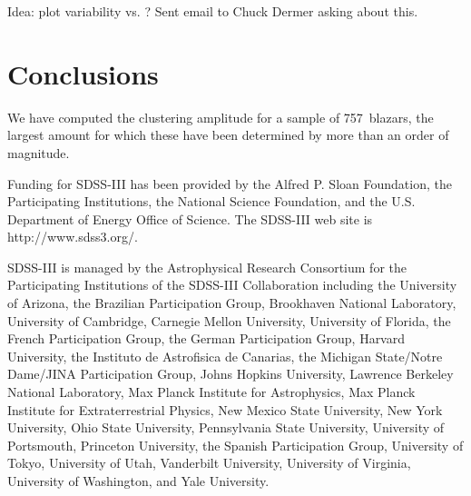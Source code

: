 \documentclass{emulateapj}
\begin{document}
Idea: plot variability vs. \bgb? Sent email to Chuck Dermer asking about this. 


\section{Conclusions}\label{sec_conclusions}

We have computed the clustering amplitude for a sample of 757~blazars, the largest amount for which these have been determined by more than an order of magnitude. 


\acknowledgments
Funding for SDSS-III has been provided by the Alfred P. Sloan Foundation, the Participating Institutions, the National Science Foundation, and the U.S. Department of Energy Office of Science. The SDSS-III web site is http://www.sdss3.org/.

SDSS-III is managed by the Astrophysical Research Consortium for the Participating Institutions of the SDSS-III Collaboration including the University of Arizona, the Brazilian Participation Group, Brookhaven National Laboratory, University of Cambridge, Carnegie Mellon University, University of Florida, the French Participation Group, the German Participation Group, Harvard University, the Instituto de Astrofisica de Canarias, the Michigan State/Notre Dame/JINA Participation Group, Johns Hopkins University, Lawrence Berkeley National Laboratory, Max Planck Institute for Astrophysics, Max Planck Institute for Extraterrestrial Physics, New Mexico State University, New York University, Ohio State University, Pennsylvania State University, University of Portsmouth, Princeton University, the Spanish Participation Group, University of Tokyo, University of Utah, Vanderbilt University, University of Virginia, University of Washington, and Yale University.
\\




\end{document}

